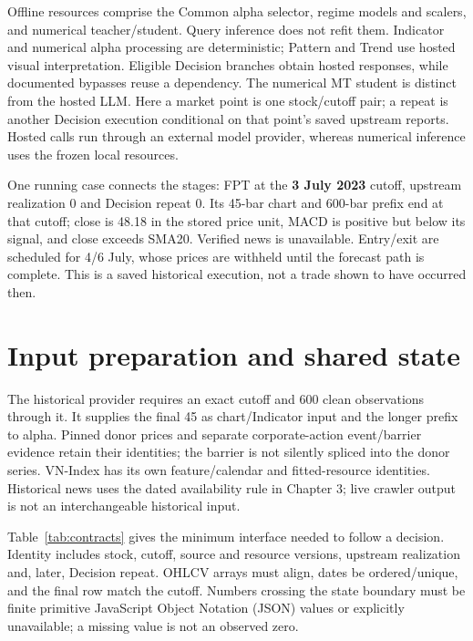 Offline resources comprise the Common alpha selector, regime models and
scalers, and numerical teacher/student. Query inference does not refit
them. Indicator and numerical alpha processing are deterministic;
Pattern and Trend use hosted visual interpretation. Eligible Decision
branches obtain hosted responses, while documented bypasses reuse a
dependency. The numerical MT student is distinct from the hosted LLM.
Here a market point is one stock/cutoff pair; a repeat is another Decision
execution conditional on that point's saved upstream reports. Hosted calls
run through an external model provider, whereas numerical inference uses
the frozen local resources.

One running case connects the stages: FPT at the \textbf{3 July 2023}
cutoff, upstream realization 0 and Decision repeat 0. Its 45-bar chart
and 600-bar prefix end at that cutoff; close is 48.18 in the stored price
unit, MACD is positive but below its signal, and close exceeds SMA20.
Verified news is unavailable. Entry/exit are scheduled for 4/6 July,
whose prices are withheld until the forecast path is complete. This is
a saved historical execution, not a trade shown to have occurred then.

\section{Input preparation and shared state}\label{s:26daba2236295e19}
The historical provider requires an exact cutoff and 600 clean
observations through it. It supplies the final 45 as chart/Indicator
input and the longer prefix to alpha. Pinned donor prices and separate
corporate-action event/barrier evidence retain their identities; the
barrier is not silently spliced into the donor series. VN-Index has its
own feature/calendar and fitted-resource identities. Historical news
uses the dated availability rule in Chapter 3; live crawler output is
not an interchangeable historical input.

Table~\ref{tab:contracts} gives the minimum interface needed to follow a
decision. Identity includes stock, cutoff, source and resource versions,
upstream realization and, later, Decision repeat. OHLCV arrays must align,
dates be ordered/unique, and the final row match the cutoff. Numbers
crossing the state boundary must be finite primitive JavaScript Object
Notation (JSON) values or
explicitly unavailable; a missing value is not an observed zero.

